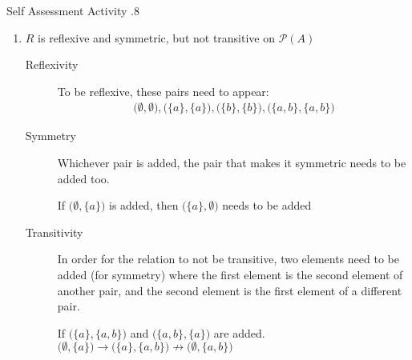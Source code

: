 \documentclass[\main/notes.tex]{subfiles}
\begin{document}
\begin{exercise}{Self Assessment Activity \thechapter.8}
\begin{questions}
\begin{enumerate}
\begin{answer}
									\end{answer}
								\item $R$ is reflexive and symmetric, but not transitive on $\mathcal{P}(A)$
									\begin{answer}
										\begin{description}
											\item[Reflexivity] To be reflexive, these pairs need to appear:
												\begin{align*}
													\bigl(\emptyset, \emptyset\bigr), \bigl(\{a\}, \{a\}\bigr), \bigl(\{b\}, \{b\}\bigr), \bigl(\{a, b\}, \{a, b\}\bigr)
												\end{align*}
											\item[Symmetry] Whichever pair is added, the pair that makes it symmetric needs to be added too.
												\begin{indentparagraph}
													If $\bigl(\emptyset, \{a\}\bigr)$ is added, then $\bigl(\{a\}, \emptyset\bigr)$ needs to be added
												\end{indentparagraph}
											\item[Transitivity] In order for the relation to not be transitive, two elements need to be added (for symmetry) where the first element is the second element of another pair, and the second element is the first element of a different pair.
												\begin{indentparagraph}
													If $\bigl(\{a\}, \{a, b\}\bigr)$ and $\bigl(\{a, b\}, \{a\}\bigr)$ are added.\\
													$\bigl(\emptyset, \{a\}\bigr) \rightarrow \bigl(\{a\}, \{a, b\}\bigr) \not \rightarrow \bigl(\emptyset, \{a, b\}\bigr)$

\end{indentparagraph}
\end{description}
\end{answer}
\end{enumerate}
\end{questions}
\end{exercise}
\end{document}
